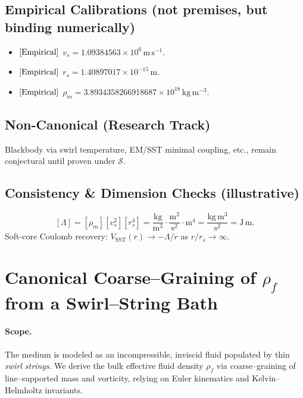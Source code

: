 \documentclass[11pt, a4paper]{article}
\newcommand{\vscore}{v_s}                                %
\newcommand{\rhof}{\rho_{\!f}}                           %
\newcommand{\rhom}{\rho_{\!m}}                           %
\newcommand{\rs}{r_s}                                    %
\begin{document}
    \subsection*{Empirical Calibrations (not premises, but binding numerically)}
    \begin{itemize}
        \item \([{\rm Empirical}]\) \(\vscore = 1.09384563\times 10^6\,\mathrm{m\,s^{-1}}\).
        \item \([{\rm Empirical}]\) \(\rs = 1.40897017\times 10^{-15}\,\mathrm{m}\).
        \item \([{\rm Empirical}]\) \(\rhom = 3.8934358266918687\times 10^{18}\,\mathrm{kg\,m^{-3}}\).
    \end{itemize}

    \subsection*{Non-Canonical (Research Track)}
    Blackbody via swirl temperature, EM/SST minimal coupling, etc., remain conjectural until proven under \(\mathcal{S}\).

    \subsection*{Consistency \& Dimension Checks (illustrative)}
    \[
        [\Lambda]=[\rhom][\vscore^2][\rs^4]
        =\frac{\mathrm{kg}}{\mathrm{m^3}}\cdot\frac{\mathrm{m^2}}{\mathrm{s^2}}\cdot\mathrm{m^4}
        =\frac{\mathrm{kg\,m^3}}{\mathrm{s^2}}
        =\mathrm{J\,m}.
    \]
    Soft-core Coulomb recovery: \(V_{\text{SST}}(r)\to -\Lambda/r\) as \(r/\rs\to\infty\).



    \section{Canonical Coarse–Graining of \(\rhof\) from a Swirl–String Bath}
    \label{sec:canon_rhof_from_strings}

    \paragraph{Scope.}
    The medium is modeled as an incompressible, inviscid fluid populated by thin \emph{swirl strings}. We derive the bulk effective fluid density \(\rhof\) via coarse–graining of line–supported mass and vorticity, relying on Euler kinematics and Kelvin–Helmholtz invariants.
\end{document}

